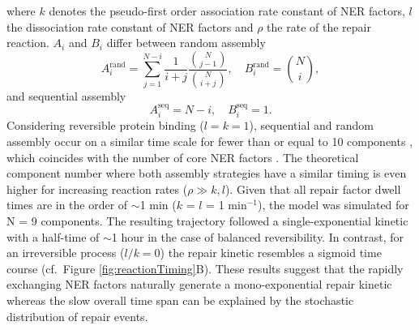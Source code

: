 where $k$ denotes the pseudo-first order association rate constant of NER factors, $l$ the dissociation rate constant of NER factors and $\rho$ the rate of the repair reaction. $A_i$ and $B_i$ differ between random assembly
\begin{equation}
A_i^\text{rand}= \sum_{j=1}^{N-i}\frac{1}{i+j}\frac{{N \choose j-1}}{{N\choose i+j}} , \quad B_i^\text{rand} = {N\choose i},\label{Eqn:coefrand}
\end{equation} 
and sequential assembly           
\begin{equation}
A_i^\text{seq}= N-i , \quad B_i^\text{seq} = 1.\label{Eqn.coefseq}
\end{equation}
Considering reversible protein binding ($l=k=1$), sequential and random assembly occur on a similar time scale for fewer than or equal to 10 components \cite{Terstiege2010}, which coincides with the number of core NER factors \cite{Luijsterburg2010}. The theoretical component number where both assembly strategies have a similar timing is even higher for increasing reaction rates ($\rho \gg k,l$). Given that all repair factor dwell times are in the order of $\sim$1 min ($k$ = $l$ = 1 $\text{min}^{-\text{1}}$), the model was simulated for N = 9 components. The resulting trajectory followed a single-exponential kinetic with a half-time of $\sim$1 hour in the case of balanced reversibility. In contrast, for an irreversible process ($l/k = 0$) the repair kinetic resembles a sigmoid time course (cf.\ Figure \ref{fig:reactionTiming}B). These results suggest that the rapidly exchanging NER factors naturally generate a mono-exponential repair kinetic whereas the slow overall time span can be explained by the stochastic distribution of repair events.
%
%


